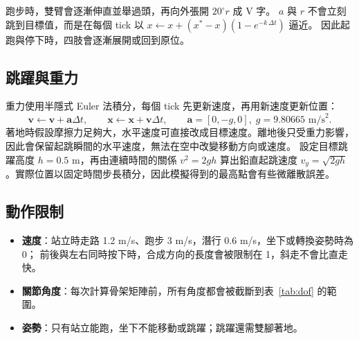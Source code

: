 跑步時，雙臂會逐漸伸直並舉過頭，再向外張開 $20^\circ r$ 成 V 字。
$a$ 與 $r$ 不會立刻跳到目標值，而是在每個 tick 以 $x \leftarrow x + (x^\ast - x)(1 - e^{-k\,\Delta t})$ 逼近。
因此起跑與停下時，四肢會逐漸展開或回到原位。

\subsection{跳躍與重力}

重力使用半隱式 Euler 法積分，每個 tick 先更新速度，再用新速度更新位置：
\begin{equation*}
    \mathbf{v} \leftarrow \mathbf{v} + \mathbf{a} \Delta t, \qquad
    \mathbf{x} \leftarrow \mathbf{x} + \mathbf{v} \Delta t, \qquad
    \mathbf{a} = [0, -g, 0],\; g = 9.80665 \text{ m/s}^2 .
\end{equation*}
著地時假設摩擦力足夠大，水平速度可直接改成目標速度。離地後只受重力影響，因此會保留起跳瞬間的水平速度，無法在空中改變移動方向或速度。
設定目標跳躍高度 $h=0.5$ m，再由連續時間的關係 $v^2=2gh$ 算出鉛直起跳速度 $v_y=\sqrt{2gh}$。實際位置以固定時間步長積分，因此模擬得到的最高點會有些微離散誤差。

\subsection{動作限制}

\begin{itemize}[nosep]
    \item \textbf{速度}：站立時走路 1.2 m/s、跑步 3 m/s，潛行 0.6 m/s，坐下或轉換姿勢時為 0；
          前後與左右同時按下時，合成方向的長度會被限制在 1，斜走不會比直走快。
    \item \textbf{關節角度}：每次計算骨架矩陣前，所有角度都會被截斷到表~\ref{tab:dof} 的範圍。
    \item \textbf{姿勢}：只有站立能跑，坐下不能移動或跳躍；跳躍還需雙腳著地。
\end{itemize}
